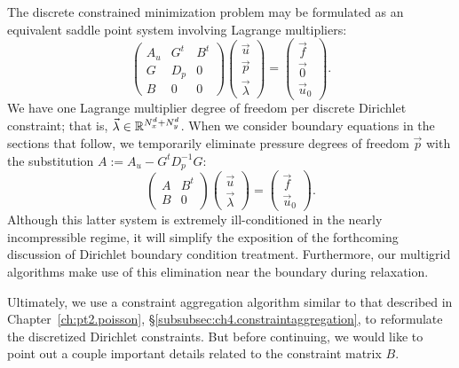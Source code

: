 The discrete constrained minimization problem may be formulated as an equivalent saddle point system involving Lagrange multipliers:
\begin{equation} \label{eq:ch5.kkt.augmented}
\begin{pmatrix} A_u & G^t & B^t \\ G & D_p & 0 \\ B & 0 & 0 \end{pmatrix}
\begin{pmatrix} \vec{u} \\ \vec{p} \\ \vec{\lambda} \end{pmatrix}
= \begin{pmatrix} \vec{f} \\ \vec{0} \\ \vec{u}_0 \end{pmatrix}.
\end{equation}
We have one Lagrange multiplier degree of freedom per discrete Dirichlet constraint; that is, $\vec{\lambda} \in \mathbb{R}^{N^d_x + N^d_y}$. When we consider boundary equations in the sections that follow, we temporarily eliminate pressure degrees of freedom $\vec{p}$ with the substitution $A := A_u - G^t D_p^{-1} G$:
\begin{equation} \label{eq:ch5.kkt.unaugmented}
\begin{pmatrix} A & B^t \\ B & 0 \end{pmatrix}
\begin{pmatrix} \vec{u} \\ \vec{\lambda} \end{pmatrix}
= \begin{pmatrix} \vec{f} \\ \vec{u}_0 \end{pmatrix}.
\end{equation}
Although this latter system is extremely ill-conditioned in the nearly incompressible regime, it will simplify the exposition of the forthcoming discussion of Dirichlet boundary condition treatment. Furthermore, our multigrid algorithms make use of this elimination near the boundary during relaxation.

Ultimately, we use a constraint aggregation algorithm similar to that described in Chapter~\ref{ch:pt2.poisson}, \S\ref{subsubsec:ch4.constraintaggregation}, to reformulate the discretized Dirichlet constraints. But before continuing, we would like to point out a couple important details related to the constraint matrix $B$.

